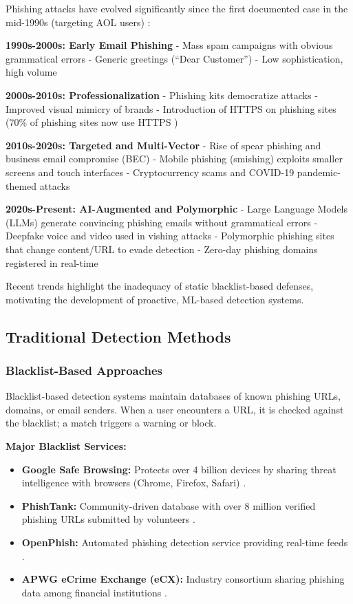 Phishing attacks have evolved significantly since the first documented
case in the mid-1990s (targeting AOL users) \cite{jakobsson2006}:

\textbf{1990s-2000s: Early Email Phishing} - Mass spam campaigns with
obvious grammatical errors - Generic greetings (``Dear Customer'') - Low
sophistication, high volume

\textbf{2000s-2010s: Professionalization} - Phishing kits democratize
attacks - Improved visual mimicry of brands - Introduction of HTTPS on
phishing sites (70\% of phishing sites now use HTTPS \cite{phishlabs2023})

\textbf{2010s-2020s: Targeted and Multi-Vector} - Rise of spear phishing
and business email compromise (BEC) - Mobile phishing (smishing)
exploits smaller screens and touch interfaces - Cryptocurrency scams and
COVID-19 pandemic-themed attacks

\textbf{2020s-Present: AI-Augmented and Polymorphic} - Large Language
Models (LLMs) generate convincing phishing emails without grammatical
errors - Deepfake voice and video used in vishing attacks - Polymorphic
phishing sites that change content/URL to evade detection - Zero-day
phishing domains registered in real-time

Recent trends highlight the inadequacy of static blacklist-based
defenses, motivating the development of proactive, ML-based detection
systems.

\subsection{Traditional Detection
Methods}\label{traditional-detection-methods}

\subsubsection{Blacklist-Based
Approaches}\label{blacklist-based-approaches}

Blacklist-based detection systems maintain databases of known phishing
URLs, domains, or email senders. When a user encounters a URL, it is
checked against the blacklist; a match triggers a warning or block.

\textbf{Major Blacklist Services:}

\begin{itemize}
\item
  \textbf{Google Safe Browsing:} Protects over 4 billion devices by
  sharing threat intelligence with browsers (Chrome, Firefox, Safari)
  \cite{google_safe_browsing}.
\item
  \textbf{PhishTank:} Community-driven database with over 8 million
  verified phishing URLs submitted by volunteers \cite{phishtank}.
\item
  \textbf{OpenPhish:} Automated phishing detection service providing
  real-time feeds \cite{openphish}.
\item
  \textbf{APWG eCrime Exchange (eCX):} Industry consortium sharing
  phishing data among financial institutions \cite{apwg_ecx}.
\end{itemize}


